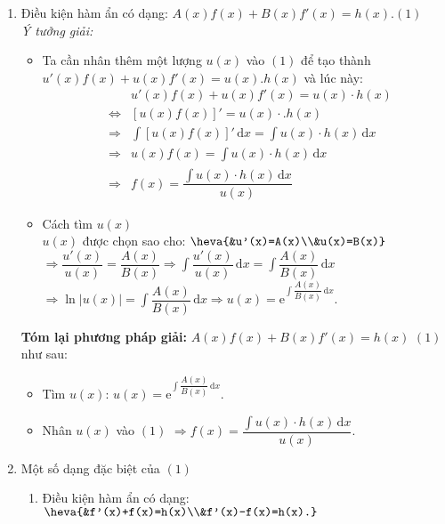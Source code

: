 \begin{dang}{}
	\begin{enumerate}
		\item Điều kiện hàm ẩn có dạng: $A(x)f(x)+B(x)f'(x)=h(x)$.\quad$(1)$\\
		\textit{Ý tưởng giải:}
		\begin{itemize}
			\item Ta cần nhân thêm một lượng $u(x)$ vào $(1)$ để tạo thành \break  $u'(x)f(x)+u(x)f'(x)=u(x).h(x)$ và lúc này:
			\allowdisplaybreaks
			\begin{eqnarray*}
				& & u'(x)f(x)+u(x)f'(x)=u(x)\cdot h(x)\\
				&\Leftrightarrow & \left[u(x)f(x)\right]'=u(x)\cdot .h(x)\\
				&\Rightarrow& \displaystyle\int \left[u(x)f(x)\right]'\mathrm{\,d}x= \displaystyle\int u(x)\cdot h(x)\mathrm{\,d}x\\
				&\Rightarrow& u(x)f(x)=\displaystyle\int u(x)\cdot h(x)\mathrm{\,d}x\\
				&\Rightarrow& f(x)=\dfrac{\displaystyle\int u(x)\cdot h(x)\mathrm{\,d}x}{u(x)}
			\end{eqnarray*}
			\item Cách tìm $u(x)$\\
			$u(x)$ được chọn sao cho: $\heva{&u'(x)=A(x)\\&u(x)=B(x)}$\\
			$\Rightarrow \dfrac{u'(x)}{u(x)}=\dfrac{A(x)}{B(x)} \Rightarrow \displaystyle\int \dfrac{u'(x)}{u(x)}\mathrm{\,d}x =\displaystyle\int\dfrac{A(x)}{B(x)}\mathrm{\,d}x$\\ $\Rightarrow \ln\left|u(x)\right|=\displaystyle\int \dfrac{A(x)}{B(x)}\mathrm{\,d}x \Rightarrow u(x)=\mathrm{e}^{\displaystyle\int \dfrac{A(x)}{B(x)}\mathrm{\,d}x}$.\\
		\end{itemize}
		\textbf{Tóm lại phương pháp giải:} $A(x)f(x)+B(x)f'(x)=h(x)$ $(1)$ như sau:
		\begin{itemize}
			\item Tìm $u(x)$: $u(x)=\mathrm{e}^{\displaystyle\int \dfrac{A(x)}{B(x)} \mathrm{\,d}x}$.
			\item Nhân $u(x)$ vào $(1)$ $\Rightarrow f(x)=\dfrac{\displaystyle\int{u(x)\cdot h(x)} \mathrm{\,d}x}{u(x)}$. 
		\end{itemize}
		\item Một số dạng đặc biệt của $(1)$
		\begin{enumerate}
			\item Điều kiện hàm ẩn có dạng: $\heva{&f'(x)+f(x)=h(x)\\&f'(x)-f(x)=h(x).}$\\

\end{enumerate}
\end{enumerate}
\end{dang}
